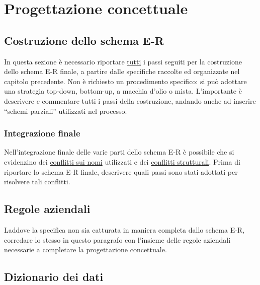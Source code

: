 \section{Progettazione concettuale}

\subsection*{Costruzione dello schema E-R}

\begin{templateblock}
    In questa sezione è necessario riportare \underline{tutti} i passi seguiti
    per la costruzione dello schema E-R finale, a partire dalle specifiche
    raccolte ed organizzate nel capitolo precedente.
    Non è richiesto un procedimento specifico: si può adottare una strategia
    top-down, bottom-up, a macchia d’olio o mista.
    L’importante è descrivere e commentare tutti i passi della costruzione,
    andando anche ad inserire “schemi parziali” utilizzati nel processo.
\end{templateblock}

\subsubsection*{Integrazione finale}

\begin{templateblock}
    Nell’integrazione finale delle varie parti dello schema E-R è possibile
    che si evidenzino dei \underline{conflitti sui nomi} utilizzati e dei
    \underline{conflitti strutturali}.
    Prima di riportare lo schema E-R finale, descrivere quali passi sono stati
    adottati per risolvere tali conflitti.
\end{templateblock}

\subsection*{Regole aziendali}

\begin{templateblock}
    Laddove la specifica non sia catturata in maniera completa dallo schema E-R,
    corredare lo stesso in questo paragrafo con l’insieme delle regole
    aziendali necessarie a completare la progettazione concettuale.
\end{templateblock}

\subsection*{Dizionario dei dati}

